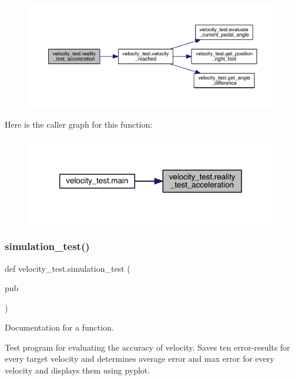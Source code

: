 \begin{figure}[H]
\begin{center}
\leavevmode
\includegraphics[width=350pt]{namespacevelocity__test_a5a1df3045e7c48f88802aed31b0f67af_cgraph}
\end{center}
\end{figure}
Here is the caller graph for this function\+:\nopagebreak
\begin{figure}[H]
\begin{center}
\leavevmode
\includegraphics[width=312pt]{namespacevelocity__test_a5a1df3045e7c48f88802aed31b0f67af_icgraph}
\end{center}
\end{figure}
\mbox{\label{namespacevelocity__test_a3abe39643659ed5bf979398a5b0cec6d}} 
\subsubsection{\texorpdfstring{simulation\_test()}{simulation\_test()}}
{\footnotesize\ttfamily def velocity\+\_\+test.\+simulation\+\_\+test (\begin{DoxyParamCaption}\item[{}]{pub }\end{DoxyParamCaption})}



Documentation for a function. 

Test program for evaluating the accuracy of velocity. Saves ten error-\/results for every target velocity and determines average error and max error for every velocity and displays them using pyplot. 

